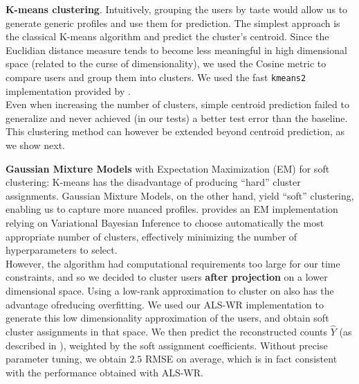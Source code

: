 \documentclass[10pt,a4paper]{article}
\begin{document}
    \noindent
    \textbf{K-means clustering}. Intuitively, grouping the users by taste would allow us to generate generic profiles and use them for prediction. The simplest approach is the classical K-means algorithm and predict the cluster's centroid. Since the Euclidian distance measure tends to become less meaningful in high dimensional space (related to the curse of dimensionality), we used the Cosine metric to compare users and group them into clusters. We used the fast \texttt{kmeans2} implementation provided by \cite{piotrtoolbox}.\\
    Even when increasing the number of clusters, simple centroid prediction failed to generalize and never achieved (in our tests) a better test error than the baseline. This clustering method can however be extended beyond centroid prediction, as we show next.

    \noindent
    \textbf{Gaussian Mixture Models} with Expectation Maximization (EM) for soft clustering: K-means has the disadvantage of producing ``hard'' cluster assignments. Gaussian Mixture Models, on the other hand, yield ``soft'' clustering, enabling us to capture more nuanced profiles. \cite{gaussian-mixture-model-script} provides an EM implementation relying on Variational Bayesian Inference to choose automatically the most appropriate number of clusters, effectively minimizing the number of hyperparameters to select.\\
    However, the algorithm had computational requirements too large for our time constraints, and so we decided to cluster users \textbf{after projection} on a lower dimensional space. Using a low-rank approximation to cluster on also has the advantage ofreducing overfitting. We used our ALS-WR implementation to generate this low dimensionality approximation of the users, and obtain soft cluster assignments in that space. We then predict the reconstructed counts $\hat Y$ (as described in \cite{alswr}), weighted by the soft assignment coefficients. Without precise parameter tuning, we obtain $2.5$ RMSE on average, which is in fact consistent with the performance obtained with ALS-WR.\\
\end{document}
